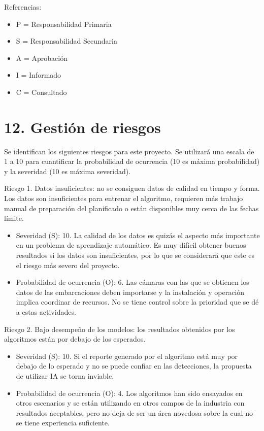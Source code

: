 \documentclass[11pt]{charter}
\begin{document}
\begin{table}[htpb]
{\begin{tabular}{|c|c|c|c|c|}
 
\end{tabular}%
}
\end{table}

{\footnotesize
Referencias:
\begin{itemize}
	\item P = Responsabilidad Primaria
	\item S = Responsabilidad Secundaria
	\item A = Aprobación
	\item I = Informado
	\item C = Consultado
\end{itemize}
} %

\section{12. Gestión de riesgos}
\label{sec:riesgos}

Se identifican los siguientes riesgos para este proyecto. Se utilizará una escala de 1 a 10 para cuantificar la probabilidad de ocurrencia (10 es máxima probabilidad) y la severidad (10 es máxima severidad).

Riesgo 1. Datos insuficientes: no se consiguen datos de calidad en tiempo y forma. Los datos son insuficientes para entrenar el algoritmo, requieren más trabajo manual de preparación del planificado o están disponibles muy cerca de las fechas límite.
\begin{itemize}
	\item Severidad (S): 10. La calidad de los datos es quizás el aspecto más importante en un problema de aprendizaje automático. Es muy difícil obtener buenos resultados si los datos son insuficientes, por lo que se considerará que este es el riesgo más severo del proyecto.
	\item Probabilidad de ocurrencia (O): 6. Las cámaras con las que se obtienen los datos de las embarcaciones deben importarse y la instalación y operación implica coordinar de recursos. No se tiene control sobre la prioridad que se dé a estas actividades. 
\end{itemize}

Riesgo 2. Bajo desempeño de los modelos: los resultados obtenidos por los algoritmos están por debajo de los esperados.
\begin{itemize}
	\item Severidad (S): 10. Si el reporte generado por el algoritmo está muy por debajo de lo esperado y no se puede confiar en las detecciones, la propuesta de utilizar IA se torna inviable.
	\item Probabilidad de ocurrencia (O): 4. Los algoritmos han sido ensayados en otros escenarios y se están utilizando en otros campos de la industria con resultados aceptables, pero no deja de ser un área novedosa sobre la cual no se tiene experiencia suficiente.
\end{itemize}
\end{document}
